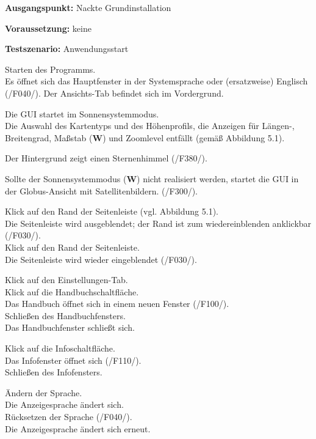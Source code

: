 \documentclass[10pt]{scrreprt}
\newcommand{\sfbf}[1]{\textbf{\sffamily #1}}
\newcommand{\W}{\sfbf{W}}
\newcommand{\ziel}[1]{{\fontsize{9.5}{11}\textsf{/#1/}}}
\newcommand{\ziellabel}{Z}
\newcommand{\muss}{\renewcommand{\labelenumi}{\textbf{\ziel{\ziellabel\numprint{\theenumi}0}}}}
\newcommand{\wunsch}{\renewcommand{\labelenumi}{\textbf{\ziel{\ziellabel\numprint{\theenumi}0W}}}}
\newenvironment{details}[1][6pt]{%
  \parskip#1 \parindent6mm \raggedright%
  \def\item{\par\ignorespaces\hangindent=5mm \hangafter1}}{%
  \par\ignorespaces}
\begin{document}
\begin{details}[2pt]
\item \sfbf{Ausgangspunkt:} Nackte Grundinstallation 
\item \sfbf{Voraussetzung:} keine
\item \sfbf{Testszenario:} Anwendungsstart
\end{details}
\vspace{2mm}
\begin{enumerate}[leftmargin = 2.2cm]
\item Starten des Programms.\\Es öffnet sich das Hauptfenster in der Systemsprache oder (ersatzweise) Englisch (\ziel{F040}). Der Ansichts-Tab befindet sich im Vordergrund.
\wunsch
\item Die GUI startet im Sonnensystemmodus.\\Die Auswahl des Kartentyps und des Höhenprofils, die Anzeigen für Längen-, Breitengrad, Maßstab (\W) und Zoomlevel entfällt (gemäß Abbildung 5.1).
\muss
\item Der Hintergrund zeigt einen Sternenhimmel (\ziel{F380}).
\item Sollte der Sonnensystemmodus (\W) nicht realisiert werden, startet die GUI in der Globus-Ansicht mit Satellitenbildern. (\ziel{F300}).
\item Klick auf den Rand der Seitenleiste (vgl. Abbildung 5.1).\\ Die Seitenleiste wird ausgeblendet; der Rand ist zum wiedereinblenden anklickbar (\ziel{F030}).\\Klick auf den Rand der Seitenleiste.\\Die Seitenleiste wird wieder eingeblendet (\ziel{F030}).
\item Klick auf den Einstellungen-Tab.\\Klick auf die Handbuchschaltfläche.\\Das Handbuch öffnet sich in einem neuen Fenster (\ziel{F100}).\\Schließen des Handbuchfensters.\\ Das Handbuchfenster schließt sich.
\item Klick auf die Infoschaltfläche.\\Das Infofenster öffnet sich (\ziel{F110}).\\Schließen des Infofensters.
\item Ändern der Sprache.\\Die Anzeigesprache ändert sich.\\ Rücksetzen der Sprache (\ziel{F040}).\\Die Anzeigesprache ändert sich erneut.
\end{enumerate}
\end{document}
